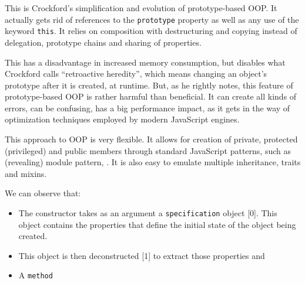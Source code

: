 This is Crockford's simplification and evolution of prototype-based OOP. It actually gets rid of references to the \texttt{prototype} property as well as any use of the keyword \texttt{this}. It relies on composition with destructuring and copying instead of delegation, prototype chains and sharing of properties.

This has a disadvantage in increased memory consumption, but disables what Crockford calls ``retroactive heredity'', which means changing an object's prototype after it is created, at runtime. But, as he rightly notes, this feature of prototype-based OOP is rather harmful than beneficial. It can create all kinds of errors, can be confusing, has a big performance impact, as it gets in the way of optimization techniques employed by modern JavaScript engines\cite{mdn_set_prototype_of, v8_design}.

This approach to OOP is very flexible. It allows for creation of private, protected (privileged) and public members through standard JavaScript patterns, such as (revealing) module pattern\cite[Chapter~JavaScript Design Patterns, Section~The Revealing Module Pattern]{js_design_patterns}, \cite{crockford_private}. It is also easy to emulate multiple inheritance, traits and mixins.

We can observe that:
\begin{itemize}
    \item The constructor takes as an argument a \texttt{specification} object [0]. This object contains the properties that define the initial state of the object being created.
    \item This object is then deconstructed [1] to extract those properties and 
    \item A \texttt{method} 
\end{itemize}


